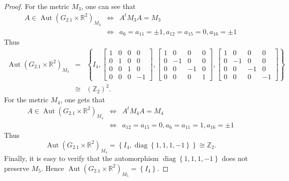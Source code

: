 \documentclass[12pt,a4paper,twoside]{article}
\theoremstyle{definition}
\newcommand{\edit}[1]{\textcolor{myeditcolor}{#1}}
\begin{document}
\begin{proof}
For the metric $M_3$, one can see that
\begin{eqnarray*}
A \in \operatorname{Aut}\left(G_{2.1} \times \mathbb{R}^2\right)_{M_3} &\Leftrightarrow& A^tM_3A = M_3\\
&\Leftrightarrow& a_6 = a_{11} = \pm1, a_{12} = a_{15} = 0, a_{16} = \pm1
\end{eqnarray*}
Thus
\begin{eqnarray*}
\operatorname{Aut}\left(G_{2.1} \times \mathbb{R}^2\right)_{M_3} &=& \left\lbrace I_4, \begin{bmatrix}
1 & 0 & 0 & 0\\
0 & 1 & 0 & 0\\
0 & 0 & 1 & 0\\
0 & 0 & 0 & -1
\end{bmatrix}, \begin{bmatrix}
1 & 0 & 0 & 0\\
0 & -1 & 0 & 0\\
0 & 0 & -1 & 0\\
0 & 0 & 0 & 1
\end{bmatrix}, \begin{bmatrix}
1 & 0 & 0 & 0\\
0 & -1 & 0 & 0\\
0 & 0 & -1 & 0\\
0 & 0 & 0 & -1
\end{bmatrix} \right\rbrace\\
&\cong& (\mathbb{Z}_2)^2.
\end{eqnarray*}
For the metric $M_4$, one gets that
\begin{eqnarray*}
A \in \operatorname{Aut}\left(G_{2.1} \times \mathbb{R}^2\right)_{M_4} &\Leftrightarrow& A^tM_4A = M_4\\
&\Leftrightarrow& a_{12} = a_{15} = 0, a_6 = a_{11} = 1, a_{16} = \pm1
\end{eqnarray*}
Thus
$$\operatorname{Aut}\left(G_{2.1} \times \mathbb{R}^2\right)_{M_4} = \left\lbrace I_4, \operatorname{diag}\left\lbrace 1, 1, 1, -1\right\rbrace \right\rbrace \cong \mathbb{Z}_2.$$
\edit{Finally, it is easy to verify that the automorphism $\operatorname{diag}\left\lbrace 1, 1, 1, -1\right\rbrace$ does not preserve $M_5$. Hence $\operatorname{Aut}\left(G_{2.1} \times \mathbb{R}^2\right)_{M_5} = \left\lbrace I_4\right\rbrace$.}
\end{proof}
\end{document}
